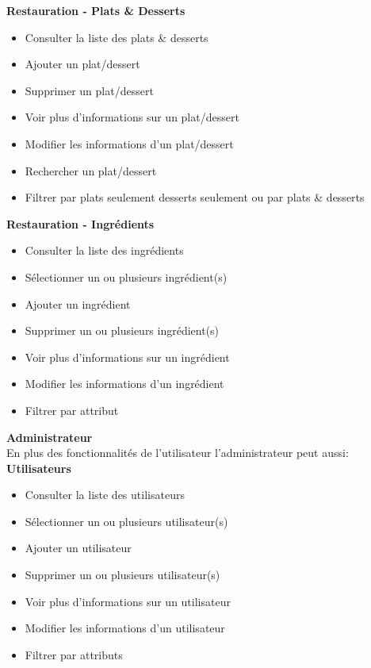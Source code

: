     \textbf{Restauration - Plats \& Desserts}
    \begin{itemize}
        \item Consulter la liste des plats \& desserts
        \item Ajouter un plat/dessert
        \item Supprimer un plat/dessert
        \item Voir plus d'informations sur un plat/dessert
        \item Modifier les informations d'un plat/dessert
        \item Rechercher un plat/dessert
        \item Filtrer par plats seulement desserts seulement ou par plats \& desserts\\
    \end{itemize}

    \textbf{Restauration - Ingrédients}
    \begin{itemize}
        \item Consulter la liste des ingrédients
        \item Sélectionner un ou plusieurs ingrédient(s)
        \item Ajouter un ingrédient
        \item Supprimer un ou plusieurs ingrédient(s)
        \item Voir plus d'informations sur un ingrédient
        \item Modifier les informations d'un ingrédient
        \item Filtrer par attribut\\
    \end{itemize}

    \textbf{Administrateur\\}
    En plus des fonctionnalités de l'utilisateur l'administrateur peut aussi: \\
    \textbf{Utilisateurs}
    \begin{itemize}
        \item Consulter la liste des utilisateurs
        \item Sélectionner un ou plusieurs utilisateur(s)
        \item Ajouter un utilisateur
        \item Supprimer un ou plusieurs utilisateur(s)
        \item Voir plus d'informations sur un utilisateur
        \item Modifier les informations d'un utilisateur
        \item Filtrer par attributs\\
    \end{itemize}

